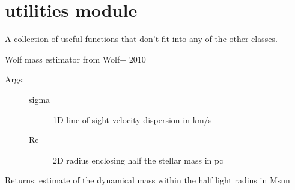 \documentclass[letterpaper,10pt,english]{sphinxmanual}
\begin{document}
\begin{fulllineitems}
\begin{fulllineitems}
\end{fulllineitems}


\begin{fulllineitems}
\label{\detokenize{timecourse:galaxy.timecourse.TimeCourse.read_total_angmom_db}}
\end{fulllineitems}


\end{fulllineitems}



\chapter{utilities module}
\label{\detokenize{utilities:utilities-module}}\label{\detokenize{utilities::doc}}
A collection of useful functions that don’t fit into any of the other classes.

\label{\detokenize{utilities:module-galaxy.utilities}}

\begin{fulllineitems}
\label{\detokenize{utilities:galaxy.utilities.wolf_mass}}
Wolf mass estimator from Wolf+ 2010
\begin{description}
\item[{Args:}] \leavevmode\begin{description}
\item[{sigma}] \leavevmode{[}{]}
1D line of sight velocity dispersion in km/s

\item[{Re}] \leavevmode{[}{]}
2D radius enclosing half the stellar mass in pc

\end{description}

\end{description}

Returns: estimate of the dynamical mass within the half light radius in Msun

\end{fulllineitems}
\end{document}
